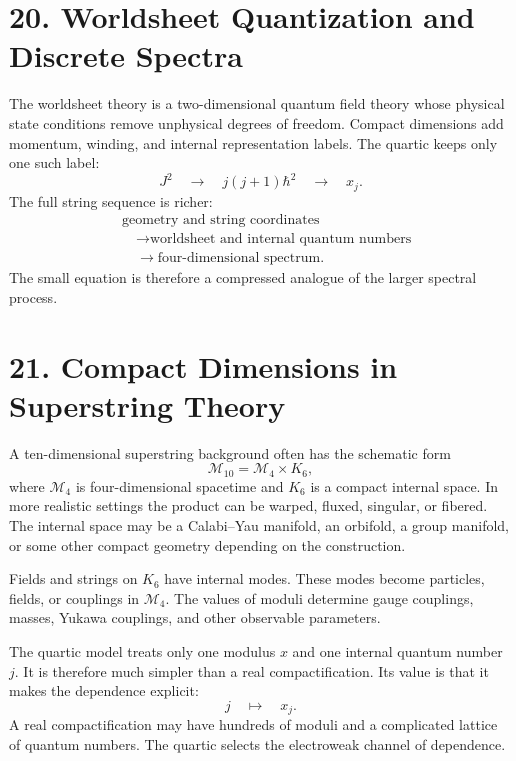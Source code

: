 \documentclass[11pt]{article}
\newcommand{\hb}{\hbar}
\begin{document}
\section*{20. Worldsheet Quantization and Discrete Spectra}

The worldsheet theory is a two-dimensional quantum field theory whose physical state conditions remove unphysical degrees of freedom. Compact dimensions add momentum, winding, and internal representation labels. The quartic keeps only one such label:
\[
        J^2\quad\longrightarrow\quad j(j+1)\hb^2
        \quad\longrightarrow\quad
        x_j .
\]
The full string sequence is richer:
\[
        \begin{aligned}
        &\text{geometry and string coordinates} \\
        &\quad\longrightarrow
        \text{worldsheet and internal quantum numbers} \\
        &\quad\longrightarrow
        \text{four-dimensional spectrum}.
        \end{aligned}
\]
The small equation is therefore a compressed analogue of the larger spectral process.


\section*{21. Compact Dimensions in Superstring Theory}

A ten-dimensional superstring background often has the schematic form
\[
        \mathcal{M}_{10}=\mathcal{M}_4\times K_6 ,
\]
where \(\mathcal{M}_4\) is four-dimensional spacetime and \(K_6\) is a compact internal space. In more realistic settings the product can be warped, fluxed, singular, or fibered. The internal space may be a Calabi--Yau manifold, an orbifold, a group manifold, or some other compact geometry depending on the construction.

Fields and strings on \(K_6\) have internal modes. These modes become particles, fields, or couplings in \(\mathcal{M}_4\). The values of moduli determine gauge couplings, masses, Yukawa couplings, and other observable parameters.

The quartic model treats only one modulus \(x\) and one internal quantum number \(j\). It is therefore much simpler than a real compactification. Its value is that it makes the dependence explicit:
\[
        j\quad\mapsto\quad x_j .
\]
A real compactification may have hundreds of moduli and a complicated lattice of quantum numbers. The quartic selects the electroweak channel of dependence.
\end{document}
